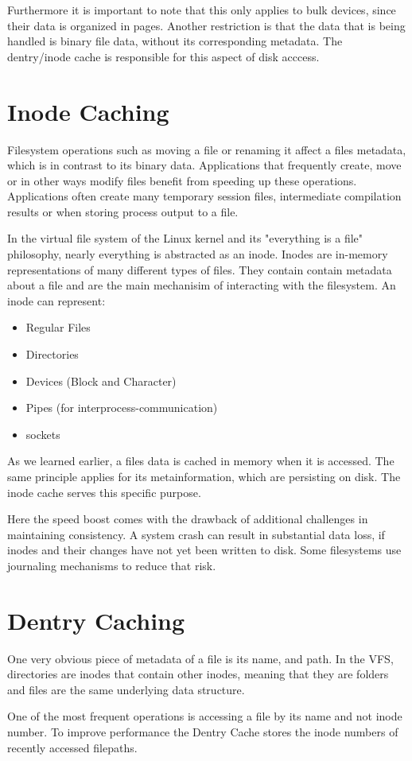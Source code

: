 Furthermore it is important to note that this only applies to bulk devices, since their data is organized in pages. Another restriction is that the data that is being handled is binary file data, without its corresponding metadata. The dentry/inode cache is responsible for this aspect of disk acccess.

\section{Inode Caching}
Filesystem operations such as moving a file or renaming it affect a files metadata, which is in contrast to its binary data.
Applications that frequently create, move or in other ways modify files  benefit from speeding up these operations. Applications often create many temporary session files, intermediate compilation results or when storing process output to a file.

In the virtual file system of the Linux kernel and its "everything is a file" philosophy, nearly everything is abstracted as an inode. Inodes are in-memory representations of many different types of files. They contain contain metadata about a file and are the main mechanisim of interacting with the filesystem. An inode can represent\cite{inode}: 

\begin{itemize}
\item Regular Files
\item Directories
\item Devices (Block and Character)
\item Pipes (for interprocess-communication)
\item sockets
\end{itemize}

As we learned earlier, a files data is cached in memory when it is accessed. The same principle applies for its metainformation, which are persisting on disk. The inode cache serves this specific purpose. 

Here the speed boost comes with the drawback of additional challenges in maintaining consistency. A system crash can result in substantial data loss, if inodes and their changes have not yet been written to disk. Some filesystems use journaling mechanisms to reduce that risk.\cite{journaling}

\section{Dentry Caching}
One very obvious piece of metadata of a file is its name, and path. In the VFS, directories are inodes that contain other inodes, meaning that they are folders and files are the same underlying data structure.

One of the most frequent operations is accessing a file by its name and not inode number. To improve performance the Dentry Cache stores the inode numbers of recently accessed filepaths. \cite{dentry_caching}





